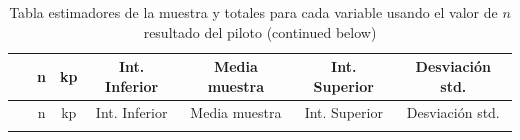 \documentclass[
]{article}
\begin{document}
\begin{longtable}[]{@{}ccccccc@{}}
\caption{Tabla estimadores de la muestra y totales para cada variable
usando el valor de \(n\) resultado del piloto (continued
below)}\tabularnewline
\toprule
\begin{minipage}[b]{0.25\columnwidth}\centering
~\strut
\end{minipage} & \begin{minipage}[b]{0.07\columnwidth}\centering
n\strut
\end{minipage} & \begin{minipage}[b]{0.06\columnwidth}\centering
kp\strut
\end{minipage} & \begin{minipage}[b]{0.10\columnwidth}\centering
Int. Inferior\strut
\end{minipage} & \begin{minipage}[b]{0.10\columnwidth}\centering
Media muestra\strut
\end{minipage} & \begin{minipage}[b]{0.10\columnwidth}\centering
Int. Superior\strut
\end{minipage} & \begin{minipage}[b]{0.12\columnwidth}\centering
Desviación std.\strut
\end{minipage}\tabularnewline
\midrule
\endfirsthead
\toprule
\begin{minipage}[b]{0.25\columnwidth}\centering
~\strut
\end{minipage} & \begin{minipage}[b]{0.07\columnwidth}\centering
n\strut
\end{minipage} & \begin{minipage}[b]{0.06\columnwidth}\centering
kp\strut
\end{minipage} & \begin{minipage}[b]{0.10\columnwidth}\centering
Int. Inferior\strut
\end{minipage} & \begin{minipage}[b]{0.10\columnwidth}\centering
Media muestra\strut
\end{minipage} & \begin{minipage}[b]{0.10\columnwidth}\centering
Int. Superior\strut
\end{minipage} & \begin{minipage}[b]{0.12\columnwidth}\centering
Desviación std.\strut
\end{minipage}\tabularnewline
\midrule
\endhead
\begin{minipage}[t]{0.25\columnwidth}\centering

\end{minipage}
\end{longtable}
\end{document}
